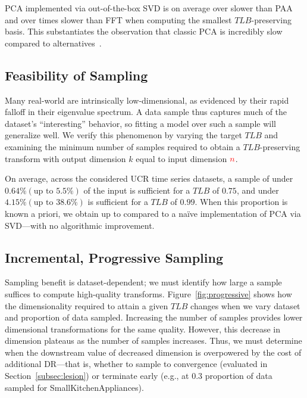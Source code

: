 PCA implemented via out-of-the-box SVD is on average over  slower than PAA and over  times slower than FFT when computing the smallest $TLB$-preserving basis.
This substantiates the observation that classic PCA is incredibly slow compared to alternatives~\cite{keogh-study}. 




\subsection{Feasibility of Sampling}
Many real-world  are intrinsically low-dimensional, as evidenced by their rapid falloff in their eigenvalue spectrum.
A data sample thus captures much of the dataset's ``interesting'' behavior, so fitting a model over such a sample will generalize well. We verify this phenomenon by varying the target $TLB$ and examining the minimum number of samples required to obtain a $TLB$-preserving transform with output dimension $k$ equal to input dimension ${\color{red}n}$.

On average, across the considered UCR time series datasets, a sample of under $0.64\% (\text{up to } 5.5\%)$ of the input is sufficient for a $TLB$ of $0.75$, and under $4.15\% (\text{up to } 38.6\%)$ is sufficient for a $TLB$ of $0.99$.  
When this proportion is known a priori, we obtain up to  compared to a na\"ive implementation of PCA via SVD---with no algorithmic improvement. 


\subsection{Incremental, Progressive Sampling}
Sampling benefit is dataset-dependent; we must identify how large a sample suffices to compute high-quality transforms.
Figure~\ref{fig:progressive} shows how the dimensionality required to attain a given $TLB$ changes when we vary dataset and proportion of data sampled.
Increasing the number of samples provides lower dimensional transformations for the same quality.
However, this decrease in dimension plateaus as the number of samples increases.
Thus, we must determine when the downstream value of decreased dimension is overpowered by the cost of additional DR---that is, whether to sample to convergence (evaluated in Section~\ref{subsec:lesion}) or terminate early (e.g., at $0.3$ proportion of data sampled for SmallKitchenAppliances). 


